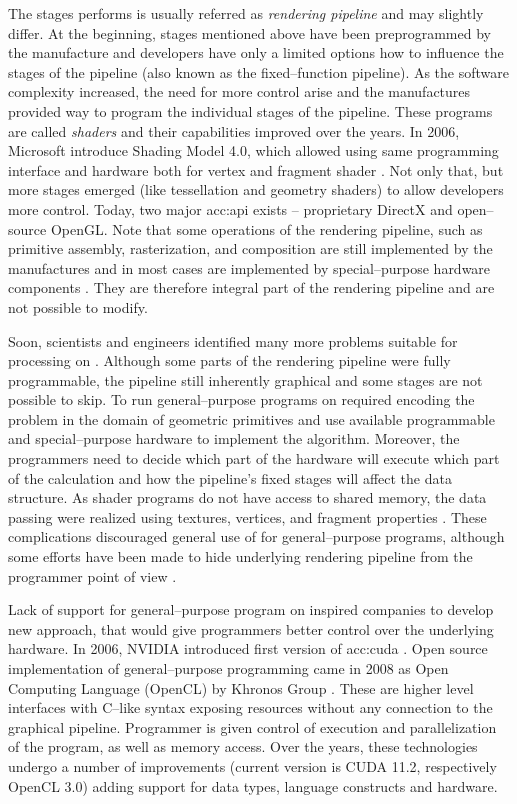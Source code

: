The stages \gpu performs is usually referred as \emph{rendering pipeline} and may slightly differ. At the beginning, stages mentioned above have been preprogrammed by the manufacture and developers have only a limited options how to influence the stages of the pipeline (also known as the fixed--function pipeline). As the software complexity increased, the need for more control arise and the manufactures provided way to program the individual stages of the pipeline. These programs are called \emph{shaders} and their capabilities improved over the years. In 2006, Microsoft introduce Shading Model 4.0, which allowed using same programming interface and hardware both for vertex and fragment shader \citep{DirectX10}. Not only that, but more stages emerged (like tessellation and geometry shaders) to allow developers more control. Today, two major \acrfull{acc:api} exists -- proprietary  DirectX and open--source OpenGL. Note that some operations of the rendering pipeline, such as primitive assembly, rasterization, and composition are still implemented by the \gpu manufactures and in most cases are implemented by special--purpose hardware components \citep{SoftwareRasterization}. They are therefore integral part of the rendering pipeline and are not possible to modify.

Soon, scientists and engineers identified many more problems suitable for processing on \gpu. Although some parts of the rendering pipeline were fully programmable, the pipeline still inherently graphical and some stages are not possible to skip. To run general--purpose programs on \gpu required encoding the problem in the domain of geometric primitives and use available programmable and special--purpose hardware to implement the algorithm. Moreover, the programmers need to decide which part of the hardware will execute which part of the calculation and how the pipeline's fixed stages will affect the data structure. As shader programs do not have access to shared memory, the data passing were realized using textures, vertices, and fragment properties \citep{GPUComputingOwens}. These complications discouraged general use of \gpu for general--purpose programs, although some efforts have been made to hide underlying rendering pipeline from the programmer point of view \citep{BrookGPU}.

Lack of support for general--purpose program on \gpu inspired companies to develop new approach, that would give programmers better control over the underlying hardware. In 2006, NVIDIA introduced first version of \acrfull{acc:cuda} \citep{CUDAwiki}. Open source implementation of general--purpose programming came in 2008 as Open Computing Language (OpenCL) by Khronos Group \citep{OpenCLRelease}. These are higher level interfaces with C--like syntax exposing \gpu resources without any connection to the graphical pipeline. Programmer is given control of execution and parallelization of the program, as well as memory access. Over the years, these technologies undergo a number of improvements (current version is CUDA 11.2, respectively OpenCL 3.0) adding support for data types, language constructs and hardware.

